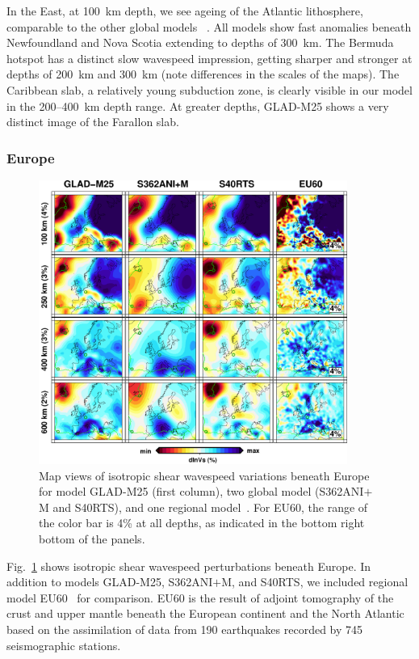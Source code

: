 \documentclass[extra,mreferee]{gji}
\begin{document}
In the East, at 100~km depth,
we see ageing of the Atlantic lithosphere, comparable to the other global models
~\citep{muller2008, schaeffer2014imaging}.
All models show fast anomalies beneath Newfoundland and Nova Scotia extending to
depths of 300~km.
The Bermuda hotspot has a distinct slow wavespeed impression,
getting sharper and stronger at depths of 200~km and 300~km (note differences in
the scales of the maps).
The Caribbean slab, a relatively young subduction zone, is clearly
visible in our model in the 200--400~km depth range.
At greater depths,
GLAD-M25 shows a very distinct image of the Farallon slab.

\subsubsection{Europe}

\begin{figure}[ht!]
\includegraphics[width=0.9\textwidth]{figures/depth_slice/europe_vs.pdf}
  \caption{\small{Map views of isotropic shear wavespeed variations beneath Europe for model GLAD-M25 (first column), two global model (S362ANI$+$M and S40RTS), and
  one regional model~\citep[EU60;][]{zhu2015seismic}. For EU60, the range of the color
  bar is 4\% at all depths, as indicated in the bottom right bottom of the panels.}}
\label{fig:europe-vs}
\centering
\end{figure}

Fig.~\ref{fig:europe-vs} shows isotropic shear wavespeed perturbations beneath Europe.
In addition to models GLAD-M25, S362ANI$+$M, and S40RTS, we included regional
model EU60~\citep{zhu2015seismic} for comparison.
EU60 is the result of adjoint tomography of the crust and upper mantle
beneath the European continent and the North Atlantic based on the assimilation of data from
190 earthquakes recorded by 745 seismographic stations.
\end{document}
